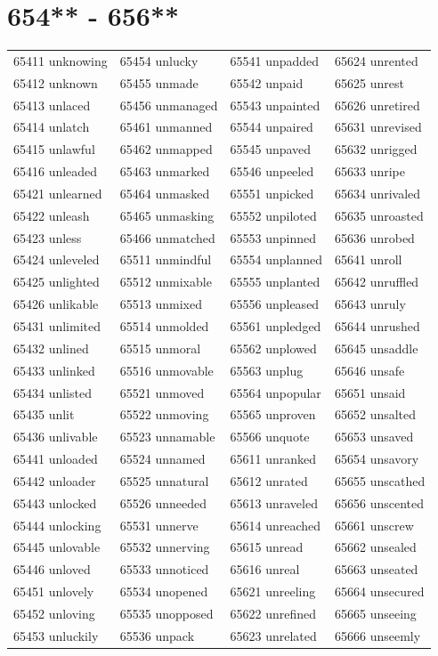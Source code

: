 \documentclass[10pt, oneside]{book}
\begin{document}
\begin{table}
	\centering
	\section*{654** - 656**}
	\begin{tabular}{l l l l}
65411 unknowing &65454 unlucky &65541 unpadded &65624 unrented\\
65412 unknown &65455 unmade &65542 unpaid &65625 unrest\\
65413 unlaced &65456 unmanaged &65543 unpainted &65626 unretired\\
65414 unlatch &65461 unmanned &65544 unpaired &65631 unrevised\\
65415 unlawful &65462 unmapped &65545 unpaved &65632 unrigged\\
65416 unleaded &65463 unmarked &65546 unpeeled &65633 unripe\\
65421 unlearned &65464 unmasked &65551 unpicked &65634 unrivaled\\
65422 unleash &65465 unmasking &65552 unpiloted &65635 unroasted\\
65423 unless &65466 unmatched &65553 unpinned &65636 unrobed\\
65424 unleveled &65511 unmindful &65554 unplanned &65641 unroll\\
65425 unlighted &65512 unmixable &65555 unplanted &65642 unruffled\\
65426 unlikable &65513 unmixed &65556 unpleased &65643 unruly\\
65431 unlimited &65514 unmolded &65561 unpledged &65644 unrushed\\
65432 unlined &65515 unmoral &65562 unplowed &65645 unsaddle\\
65433 unlinked &65516 unmovable &65563 unplug &65646 unsafe\\
65434 unlisted &65521 unmoved &65564 unpopular &65651 unsaid\\
65435 unlit &65522 unmoving &65565 unproven &65652 unsalted\\
65436 unlivable &65523 unnamable &65566 unquote &65653 unsaved\\
65441 unloaded &65524 unnamed &65611 unranked &65654 unsavory\\
65442 unloader &65525 unnatural &65612 unrated &65655 unscathed\\
65443 unlocked &65526 unneeded &65613 unraveled &65656 unscented\\
65444 unlocking &65531 unnerve &65614 unreached &65661 unscrew\\
65445 unlovable &65532 unnerving &65615 unread &65662 unsealed\\
65446 unloved &65533 unnoticed &65616 unreal &65663 unseated\\
65451 unlovely &65534 unopened &65621 unreeling &65664 unsecured\\
65452 unloving &65535 unopposed &65622 unrefined &65665 unseeing\\
65453 unluckily &65536 unpack &65623 unrelated &65666 unseemly\\
	\end{tabular}
 \end{table}
\clearpage
\end{document}
